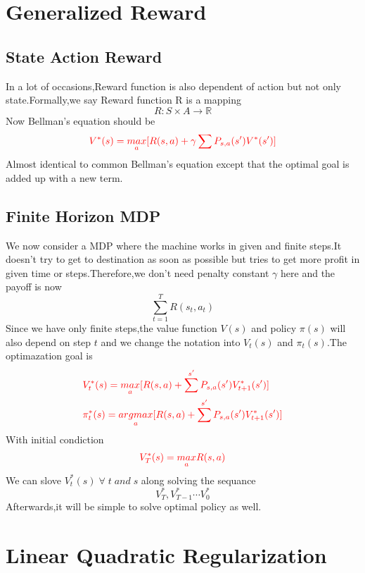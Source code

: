 \documentclass{article}
\begin{document}
\section{Generalized Reward}
\subsection{State Action Reward}
In a lot of occasions,Reward function is also dependent of action but not only state.Formally,we say Reward function R is a mapping$$R:S\times A\rightarrow \mathbb{R}$$Now Bellman's equation should be$$\textcolor{red}{V^*(s)=\underset{a}{max}[R(s,a)+\gamma\sum P_{s,a}(s')V^*(s')]}$$Almost identical to common Bellman's equation except that the optimal goal is added up with a new term.
\subsection{Finite Horizon MDP}
We now consider a MDP where the machine works in given and finite steps.It doesn't try to get to destination as soon as possible but tries to get more profit in given time or steps.Therefore,we don't need penalty constant $\gamma$ here and the payoff is now$$\sum_{t=1}^{T}R(s_t,a_t)$$
Since we have only finite steps,the value function $V(s)$ and policy $\pi(s)$ will also depend on step $t$ and we change the notation into $V_t(s)$ and $\pi_t(s)$.The optimazation goal is
\begin{align*}
	&\textcolor{red}{V^*_t(s)=\underset{a}{max}[R(s,a)+\sum^{s'}P_{s,a}(s')V^*_{t+1}(s')]}\\
	&\textcolor{red}{\pi^*_t(s)=\underset{a}{argmax}[R(s,a)+\sum^{s'}P_{s,a}(s')V^*_{t+1}(s')]}
\end{align*}
With initial condiction$$\textcolor{red}{V^*_T(s)=\underset{a}{max}R(s,a)}$$We can slove $V^*_t(s)\;\forall\;t\;and\;s$ along solving the sequance$$V^*_T,V^*_{T-1}\cdots V^*_0$$Afterwards,it will be simple to solve optimal policy as well.
\section{Linear Quadratic Regularization}
\end{document}
